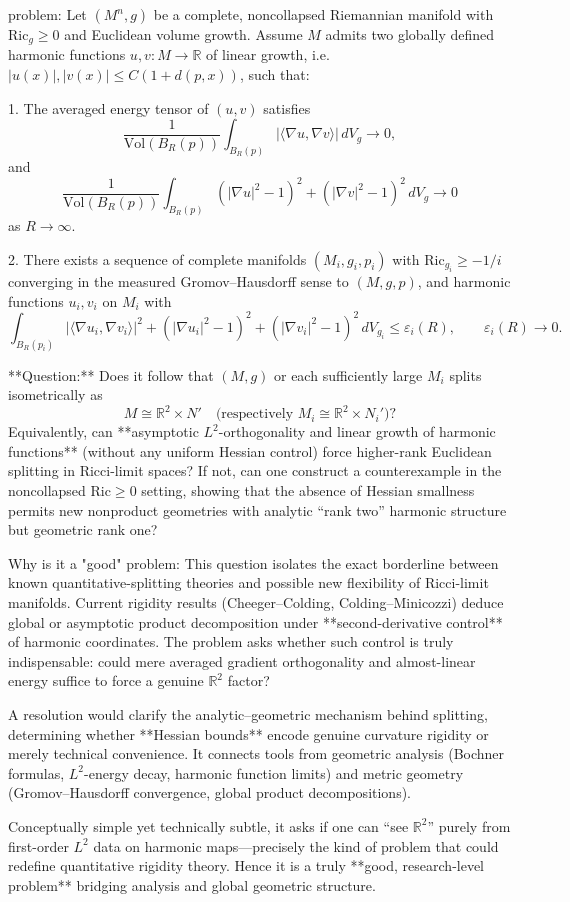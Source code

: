 problem:  
Let \((M^n,g)\) be a complete, noncollapsed Riemannian manifold with \(\mathrm{Ric}_g \ge 0\) and Euclidean volume growth.  
Assume \(M\) admits two globally defined harmonic functions \(u,v : M \to \mathbb{R}\) of linear growth, i.e. \(|u(x)|,|v(x)| \le C(1+d(p,x))\), such that:

1. The averaged energy tensor of \((u,v)\) satisfies  
   \[
   \frac{1}{\mathrm{Vol}(B_R(p))}\int_{B_R(p)} 
   |\langle\nabla u,\nabla v\rangle|\, dV_g \to 0,
   \]
   and  
   \[
   \frac{1}{\mathrm{Vol}(B_R(p))}\int_{B_R(p)} 
   (|\nabla u|^2 - 1)^2 + (|\nabla v|^2 - 1)^2\, dV_g \to 0
   \]
   as \(R\to\infty\).

2. There exists a sequence of complete manifolds \((M_i,g_i,p_i)\) with \(\mathrm{Ric}_{g_i}\ge -1/i\) converging in the measured Gromov–Hausdorff sense to \((M,g,p)\), and harmonic functions \(u_i,v_i\) on \(M_i\) with
   \[
   \int_{B_R(p_i)}|\langle\nabla u_i,\nabla v_i\rangle|^2 + (|\nabla u_i|^2-1)^2 + (|\nabla v_i|^2-1)^2 \,dV_{g_i}\le \varepsilon_i(R), \qquad \varepsilon_i(R)\to 0.
   \]

**Question:**  
Does it follow that \((M,g)\) or each sufficiently large \(M_i\) splits isometrically as  
\[
M \cong \mathbb{R}^2\times N'  \quad \text{(respectively } M_i\cong\mathbb{R}^2\times N_i')?
\]
Equivalently, can **asymptotic \(L^2\)-orthogonality and linear growth of harmonic functions** (without any uniform Hessian control) force higher-rank Euclidean splitting in Ricci-limit spaces?  
If not, can one construct a counterexample in the noncollapsed \(\mathrm{Ric}\ge0\) setting, showing that the absence of Hessian smallness permits new nonproduct geometries with analytic “rank two” harmonic structure but geometric rank one?

Why is it a "good" problem:  
This question isolates the exact borderline between known quantitative-splitting theories and possible new flexibility of Ricci-limit manifolds. Current rigidity results (Cheeger–Colding, Colding–Minicozzi) deduce global or asymptotic product decomposition under **second-derivative control** of harmonic coordinates. The problem asks whether such control is truly indispensable: could mere averaged gradient orthogonality and almost-linear energy suffice to force a genuine \(\mathbb{R}^2\) factor?

A resolution would clarify the analytic–geometric mechanism behind splitting, determining whether **Hessian bounds** encode genuine curvature rigidity or merely technical convenience. It connects tools from geometric analysis (Bochner formulas, \(L^2\)-energy decay, harmonic function limits) and metric geometry (Gromov–Hausdorff convergence, global product decompositions).  

Conceptually simple yet technically subtle, it asks if one can “see \(\mathbb{R}^2\)” purely from first-order \(L^2\) data on harmonic maps—precisely the kind of problem that could redefine quantitative rigidity theory. Hence it is a truly **good, research-level problem** bridging analysis and global geometric structure.
